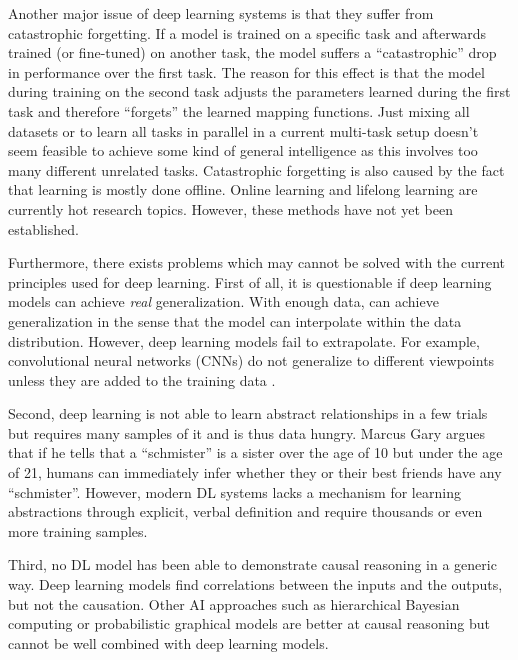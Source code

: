 Another major issue of deep learning systems is that they suffer from catastrophic forgetting.
If a model is trained on a specific task and afterwards trained (or fine-tuned) on another task, the model suffers a ``catastrophic'' drop in performance over the first task.
The reason for this effect is that the model during training on the second task adjusts the parameters learned during the first task and therefore ``forgets'' the learned mapping functions.
Just mixing all datasets or to learn all tasks in parallel in a current multi-task setup \cite{Zhang_Yang_2021} doesn't seem feasible to achieve some kind of general intelligence as this involves too many different unrelated tasks.
Catastrophic forgetting is also caused by the fact that learning is mostly done offline.
Online learning \cite{Sahoo_Pham_Lu_Hoi_2017} and lifelong learning \cite{Parisi_Kemker_Part_Kanan_Wermter_2019} are currently hot research topics.
However, these methods have not yet been established.

Furthermore, there exists problems which may cannot be solved with the current principles used for deep learning.
First of all, it is questionable if deep learning models can achieve \emph{real} generalization.
With enough data, can achieve generalization in the sense that the model can interpolate within the data distribution.
However, deep learning models fail to extrapolate.
For example, convolutional neural networks (CNNs) do not generalize to different viewpoints unless they are added to the training data .

Second, deep learning is not able to learn abstract relationships in a few trials but requires many samples of it and is thus data hungry.
Marcus Gary  argues that if he tells that a ``schmister'' is a sister over the age of 10 but under the age of 21, humans can  immediately infer whether they or their best friends have any ``schmister''. However, modern DL systems lacks a mechanism for learning abstractions through explicit, verbal definition and require thousands or even more training samples.

Third, no DL model has been able to demonstrate causal reasoning in a generic way.
Deep learning models find correlations between the inputs and the outputs, but not the causation.
Other AI approaches such as hierarchical Bayesian computing or probabilistic graphical models are better at causal reasoning but cannot be well combined with deep learning models.

